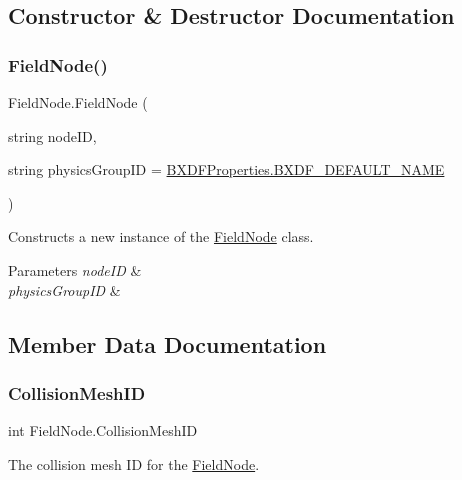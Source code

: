 \subsection{Constructor \& Destructor Documentation}
\mbox{\label{class_field_node_a9c1ee44a247358c06f9df5c91dbcb1e4}} 
\subsubsection{\texorpdfstring{Field\+Node()}{FieldNode()}}
{\footnotesize\ttfamily Field\+Node.\+Field\+Node (\begin{DoxyParamCaption}\item[{string}]{node\+ID,  }\item[{string}]{physics\+Group\+ID = {\ttfamily \hyperlink{class_b_x_d_f_properties_a528bb431080585f72f9f74bd44a23932}{B\+X\+D\+F\+Properties.\+B\+X\+D\+F\+\_\+\+D\+E\+F\+A\+U\+L\+T\+\_\+\+N\+A\+ME}} }\end{DoxyParamCaption})}



Constructs a new instance of the \hyperlink{class_field_node}{Field\+Node} class. 


\begin{DoxyParams}{Parameters}
{\em node\+ID} & \\
\hline
{\em physics\+Group\+ID} & \\
\hline
\end{DoxyParams}


\subsection{Member Data Documentation}
\mbox{\label{class_field_node_aad132e7c9b9f540962bcefb4bb5f138c}} 
\subsubsection{\texorpdfstring{Collision\+Mesh\+ID}{CollisionMeshID}}
{\footnotesize\ttfamily int Field\+Node.\+Collision\+Mesh\+ID}



The collision mesh ID for the \hyperlink{class_field_node}{Field\+Node}. 

